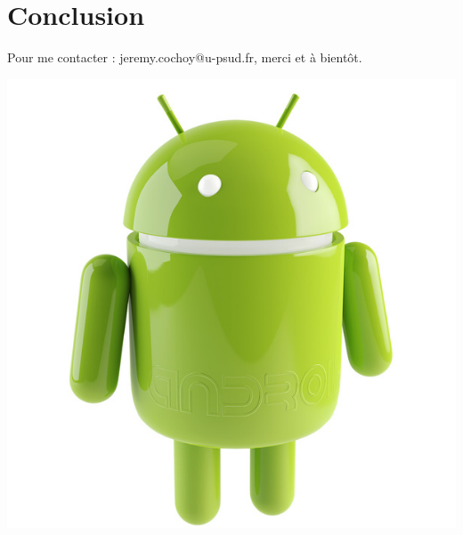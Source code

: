 \documentclass{beamer}
\begin{document}
\section{Conclusion}

\begin{frame}
\begin{center}
Pour me contacter : jeremy.cochoy@u-psud.fr, merci et à bientôt.

\medskip
\medskip
\medskip
\medskip

\includegraphics[scale=0.18]{android.jpg}
\end{center}
\end{frame}
\end{document}
